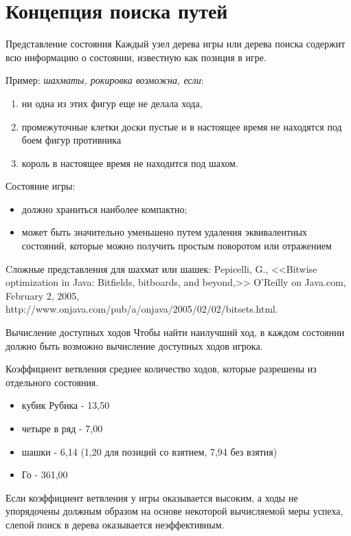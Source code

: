 \documentclass{beamer}
\begin{document}
\section{Концепция поиска путей}

\begin{frame}{Представление состояния}
Каждый узел дерева игры или дерева поиска содержит всю информацию о состоянии, известную как позиция в игре.

Пример: \textit{шахматы, рокировка возможна, если}:
\begin{enumerate}
\item ни одна из этих фигур еще не делала хода, 
\item промежуточные клетки доски пустые и в настоящее время не находятся под боем фигур противника 
\item король в настоящее время не находится под шахом. 
\end{enumerate}

Состояние игры:
\begin{itemize}
\item должно храниться наиболее компактно;
\item может быть значительно уменьшено путем удаления эквивалентных состояний, которые можно получить простым поворотом или отражением
\end{itemize}
Cложные представления для шахмат или шашек: 
Pepicelli, G., <<Bitwise optimization in Java: Bitfields, bitboards, and beyond,>> O’Reilly on Java.com, February 2, 2005, http://www.onjava.com/pub/a/onjava/2005/02/02/bitsets.html.
\end{frame}

\begin{frame}{Вычисление доступных ходов}
Чтобы найти наилучший ход, в каждом состоянии должно быть возможно вычисление доступных ходов игрока.
\begin{block}{Коэффициент ветвления}
среднее количество ходов, которые разрешены из отдельного состояния.
\end{block}
\begin{itemize}
\item кубик Рубика - 13,50
\item четыре в ряд - 7,00
\item шашки - 6,14 (1,20 для позиций со взятием, 7,94 без взятия)
\item Го - 361,00
\end{itemize}
Если коэффициент ветвления у игры оказывается высоким, а ходы не упорядочены должным образом на основе некоторой вычисляемой меры успеха, слепой поиск
в дерева оказывается неэффективным.
\end{frame}
\end{document}
